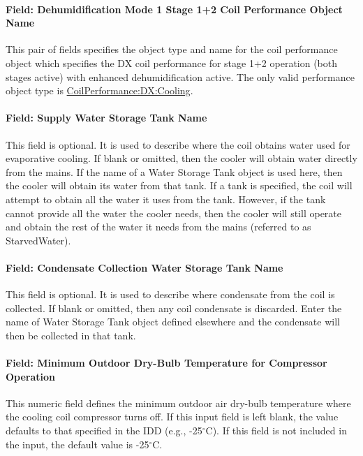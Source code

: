 \paragraph{Field: Dehumidification Mode 1 Stage 1+2 Coil Performance Object Name}\label{field-dehumidification-mode-1-stage-12-coil-performance-object-name}

This pair of fields specifies the object type and name for the coil performance object which specifies the DX coil performance for stage 1+2 operation (both stages active) with enhanced dehumidification active. The only valid performance object type is \hyperref[coilperformancedxcooling]{CoilPerformance:DX:Cooling}.

\paragraph{Field: Supply Water Storage Tank Name}\label{field-supply-water-storage-tank-name-2-000}

This field is optional. It is used to describe where the coil obtains water used for evaporative cooling. If blank or omitted, then the cooler will obtain water directly from the mains. If the name of a Water Storage Tank object is used here, then the cooler will obtain its water from that tank. If a tank is specified, the coil will attempt to obtain all the water it uses from the tank. However, if the tank cannot provide all the water the cooler needs, then the cooler will still operate and obtain the rest of the water it needs from the mains (referred to as StarvedWater).

\paragraph{Field: Condensate Collection Water Storage Tank Name}\label{field-condensate-collection-water-storage-tank-name-4}

This field is optional. It is used to describe where condensate from the coil is collected. If blank or omitted, then any coil condensate is discarded. Enter the name of Water Storage Tank object defined elsewhere and the condensate will then be collected in that tank.

\paragraph{Field: Minimum Outdoor Dry-Bulb Temperature for Compressor Operation}

This numeric field defines the minimum outdoor air dry-bulb temperature where the cooling coil compressor turns off. If this input field is left blank, the value defaults to that specified in the IDD (e.g., -25$^\circ$C). If this field is not included in the input, the default value is -25$^\circ$C.

